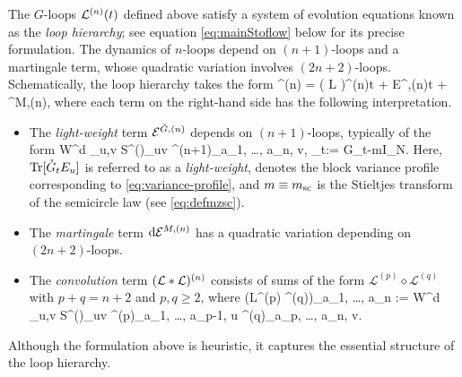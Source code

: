 The \( G \)-loops ${\cal L}^{(n)}(t)$ defined above satisfy a system of evolution equations known as the \emph{loop hierarchy}; see equation \eqref{eq:mainStoflow} below for its precise formulation. The dynamics of \( n \)-loops depend on \((n+1)\)-loops and a martingale term, whose quadratic variation involves \( (2n+2) \)-loops. Schematically, the loop hierarchy takes the form
\be\label{eq:introloop_hier}
^{(n)} = ( {\cal L}  )^{(n)}\dd t + {\cal E}^{\Gc,(n)}\dd t + ^{M,(n)}, 
\ee
where each term on the right-hand side has the following interpretation.
\begin{itemize}
	\item The \emph{light-weight} term \( {\cal E}^{\Gc,(n)} \) depends on \( (n+1) \)-loops, typically of the form
	\be\label{eq:introLWtermS}
	W^d \sum_{u,v\in \Zn} S^{(\sB)}_{uv} \cdot \tr[\Gc_t E_u]^{(n+1)}_{a_1, \ldots, a_n, v}, \quad {}\quad \Gc_t:= G_t-mI_N.
	\ee
	Here, $\tr[\Gc_t E_u]$ is referred to as a \emph{light-weight},  denotes the block variance profile corresponding to \eqref{eq:variance-profile}, and $m \equiv m_{\rm sc}$ is the Stieltjes transform of the semicircle law (see \eqref{eq:defmzsc}).
	
	\item The \emph{martingale} term \( \dd {\cal E}^{M,(n)} \) has a quadratic variation depending on  \( (2n+2) \)-loops.
	
	\item The \emph{convolution} term \( ({\cal L} \ast {\cal L})^{(n)} \) consists of sums of the form \( \mathcal{L}^{(p)} \diamond \mathcal{L}^{(q)} \) with \( p+q = n+2\) and \(p,q \ge 2 \), where
	\be\label{eq:diamond}
	({\cal L}^{(p)} ^{(q)})_{a_1, \ldots, a_n} := W^d \sum_{u,v} S^{(\sB)}_{uv} ^{(p)}_{a_1, \ldots, a_{p-1}, u} ^{(q)}_{a_p, \ldots, a_n, v}.
	\ee
\end{itemize}
Although the formulation above is heuristic, it captures the essential structure of the loop hierarchy. 



